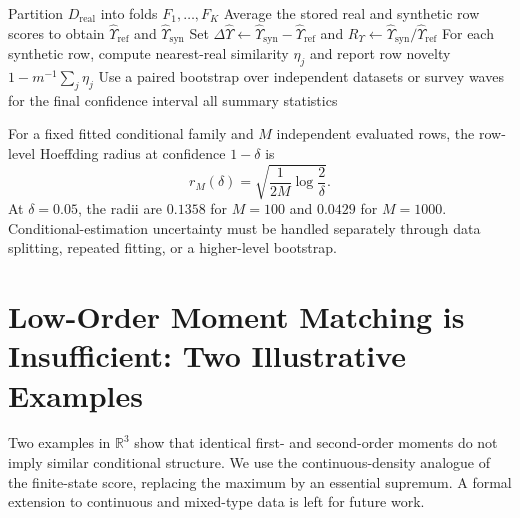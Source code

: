 \documentclass[runningheads]{llncs}
\begin{document}
\begin{algorithm}[t]
\caption{Cross-fitted conditional MAP alignment and row novelty}
\label{alg:crossfit}
\DontPrintSemicolon
{}
Partition $D_{\mathrm{real}}$ into folds $F_1,\dots,F_K$\;
Average the stored real and synthetic row scores to obtain
$\hat\Upsilon_{\mathrm{ref}}$ and $\hat\Upsilon_{\mathrm{syn}}$\;
Set $\Delta\hat\Upsilon\leftarrow
\hat\Upsilon_{\mathrm{syn}}-\hat\Upsilon_{\mathrm{ref}}$ and
$R_{\Upsilon}\leftarrow
\hat\Upsilon_{\mathrm{syn}}/\hat\Upsilon_{\mathrm{ref}}$\;
For each synthetic row, compute nearest-real similarity $\eta_j$ and report
row novelty $1-m^{-1}\sum_j\eta_j$\;
Use a paired bootstrap over independent datasets or survey waves for the final
confidence interval\;
\Return all summary statistics\;
\end{algorithm}

For a fixed fitted conditional family and $M$ independent evaluated rows, the
row-level Hoeffding radius at confidence $1-\delta$ is
\begin{equation}
r_M(\delta)=\sqrt{\frac{1}{2M}\log\frac{2}{\delta}}.
\end{equation}
At $\delta=0.05$, the radii are $0.1358$ for $M=100$ and $0.0429$ for
$M=1000$. Conditional-estimation uncertainty must be handled separately through
data splitting, repeated fitting, or a higher-level bootstrap.

\section{Low-Order Moment Matching is Insufficient: Two Illustrative Examples}\label{sec:examples}

Two examples in $\mathbb{R}^3$ show that identical first- and second-order
moments do not imply similar conditional structure. We use the
continuous-density analogue of the finite-state score, replacing the maximum by
an essential supremum. A formal extension to continuous and mixed-type data is
left for future work.
\end{document}
